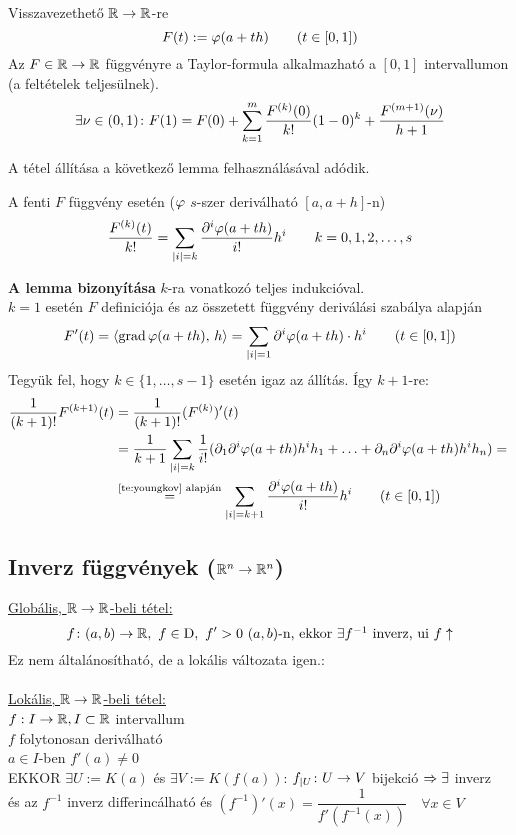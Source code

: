 \begin{biz}Visszavezethető $\mathbb{R}\to\mathbb{R}$-re\\
  \[ F(t) := \varphi(a+th)\qquad(t\in[0,1])\]
  Az $F\in\mathbb{R}\to\mathbb{R}$ függvényre a Taylor-formula alkalmazható a $[0,1]$ intervallumon (a feltételek teljesülnek).\\
  \[\displaystyle\exists \nu\in(0,1)\colon F(1) = F(0) + \sum_{k=1}^m \dfrac{F^{(k)}(0)}{k!} (1-0)^k + 
  \dfrac{F^{(m+1)}(\nu)} {h+1}\]
  
  A tétel állítása a következő lemma felhasználásával adódik.
  \begin{lemma} A fenti $F$ függvény esetén ($\varphi$ $s$-szer deriválható $[a,a+h]$-n)
    \[\displaystyle\dfrac{F^{(k)}(t)}{k!}= \sum_{|i|=k}\dfrac{\partial^i\varphi(a+th)}{i!}h^i\qquad k=0,1,2,\dotsc,s\]
  \end{lemma}
  \textbf{A lemma bizonyítása} $k$-ra vonatkozó teljes indukcióval.\\
  $k=1$ esetén $F$ definiciója és az összetett függvény deriválási szabálya alapján
  \[ F'(t) = \langle\operatorname{grad} \varphi(a+th),\,h\rangle = \sum_{|i|=1} \partial^i \varphi(a+th)\cdot h^i\qquad(t\in[0,1])\]
  Tegyük fel, hogy $k\in\{1,\dotsc,s-1\}$ esetén igaz az állítás. Így $k+1$-re:
  \begin{align*}
    \dfrac1{(k+1)!}F^{(k+1)}(t) &= \dfrac1{(k+1)!}(F^{(k)})'(t)\\
    &=\dfrac1{k+1}\sum_{|i|=k} \dfrac1{i!}
    (\partial_1\partial^i\varphi(a+th)h^ih_1+\ldots + \partial_n\partial^i\varphi(a+th)h^ih_n) ={}\\
    &\stackrel{\text{\ref{te:youngkov} alapján}}{=}
    \sum_{|i|=k+1}\dfrac{\partial^i\varphi(a+th)}{i!}h^i\qquad(t\in[0,1])
  \end{align*}
\end{biz}

\subsection{Inverz függvények ($\mathbb{R}^n\to\mathbb{R}^n$)}
\underline{Globális, $\mathbb{R}\to\mathbb{R}$-beli tétel:}\\
\[f\colon (a,b)\n\R,\ f\in\D,\ f'>0\ (a,b)$-n, ekkor $\exists f^{-1}$ inverz, ui $f\uparrow\]
Ez nem általánosítható, de a lokális változata igen.:\\\\
\underline{Lokális, $\mathbb{R}\to\mathbb{R}$-beli tétel:}\\
$f: I\to \mathbb{R}, I\subset\mathbb{R}$ intervallum\\
$f$ folytonosan deriválható\\
$a\in I$-ben $f'(a)\neq 0$\\
EKKOR $\exists U := K(a)$ és $\exists V:= K(f(a))$: $f_{|U}\colon U\to V$ bijekció $\Rightarrow \exists$ inverz\\
és az $f^{-1}$ inverz differincálható és $\left(f^{-1}\right)'(x) = \dfrac1{f'(f^{-1}(x))}\quad\forall x\in V$


